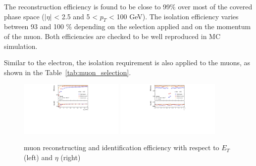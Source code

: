 The reconstruction efficiency is found to be close to 99\% over most of the covered phase space ($|\eta|$ < 2.5 and 5 < $p_{T}$ < 100 GeV). 
The isolation efficiency varies between 93 and 100 \% depending on the selection applied and on the momentum of the muon. 
Both efficiencies are checked to be well reproduced in MC simulation. 
\begin{table}[ht]
 \caption{Summary of muon selection used in this analysis}
 \label{tab:muon_selection}
\end{table}
Similar to the electron, the isolation requirement is also applied to the muons, as shown in the Table~\ref{tab:muon_selection}.
\begin{figure}[tbp]
\begin{center}
 \includegraphics[width=0.45\textwidth,keepaspectratio]{figures/Reconstruction/recoMuonpT}
 \includegraphics[width=0.45\textwidth,keepaspectratio]{figures/Reconstruction/recoMuonEta}
\caption{
muon reconstructing and identification efficiency with respect to $E_T$ (left) and $\eta$ (right) \cite{MUON-2018-03}
}
\label{fig:recoMuon}
\end{center}
\end{figure}
